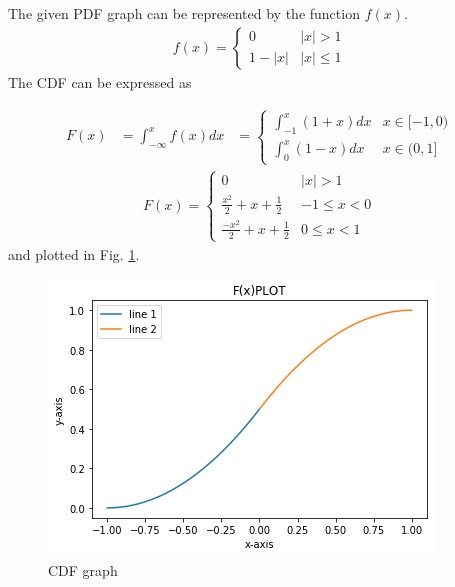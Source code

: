 The given PDF graph can be represented by the function $f(x)$.
\begin{align}f(x)=
\begin{cases}
0 & |x|>1
\\ 1-|x| &|x|\le 1
\end{cases}
\end{align}
The CDF can be expressed as 

\begin{align}
    F(x)&=\int_{-\infty}^{x}f(x)dx 
    &=
    \begin{cases}
 \int_{-1}^{x}(1+x)dx & x\in[-1,0)
\\
\int_{0}^{x}(1-x)dx & x\in(0,1]
    \end{cases}
\end{align}
\begin{align}
    F(x)=
\begin{cases}
0 &|x|>1
\\ \frac{x^2}{2}+x+\frac{1}{2} &-1\leq x <0
\\ \frac{-x^2}{2}+x+\frac{1}{2} &0\leq x <1
\end{cases}
\end{align}
and plotted in  Fig. \ref{var/1/fig:CDF graph}.
\begin{figure}
\centering
\includegraphics[width=\columnwidth]{variable/solutions/1/graph.jpg}
\caption{CDF graph}
\label{var/1/fig:CDF graph}
\end{figure}






